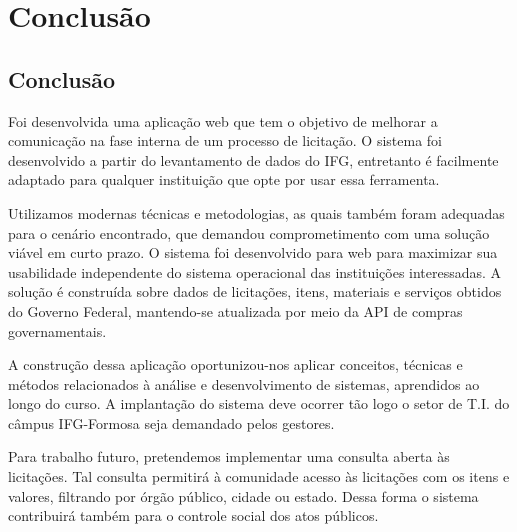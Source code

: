 \chapter[Conclusão]{Conclusão}\label{Capitulo6}

\section{Conclusão}

Foi desenvolvida uma aplicação web que tem o objetivo de melhorar a comunicação na fase interna de um processo de licitação.
O sistema foi desenvolvido a partir do levantamento de dados do IFG, entretanto é facilmente adaptado para qualquer instituição que opte por usar essa ferramenta. 

Utilizamos modernas técnicas e metodologias, as quais também foram adequadas para o cenário encontrado, que demandou comprometimento com uma solução viável em curto prazo.
O sistema foi desenvolvido para web para maximizar sua usabilidade independente do sistema operacional das instituições interessadas.
A solução é construída sobre dados de licitações, itens, materiais e serviços obtidos do Governo Federal, mantendo-se atualizada por meio da API de compras governamentais.

A construção dessa aplicação oportunizou-nos aplicar conceitos, técnicas e métodos relacionados à análise e desenvolvimento de sistemas, aprendidos ao longo do curso.
A implantação do sistema deve ocorrer tão logo o setor de T.I. do câmpus IFG-Formosa seja demandado pelos gestores.

Para trabalho futuro, pretendemos implementar uma consulta aberta às licitações.
Tal consulta permitirá à comunidade acesso às licitações com os itens e valores, filtrando por órgão público, cidade ou estado. 
Dessa forma o sistema contribuirá também para o controle social dos atos públicos.